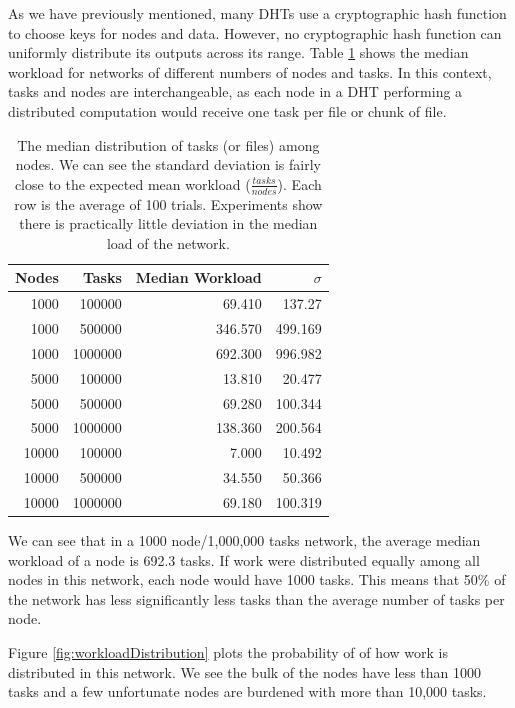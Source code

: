 \documentclass[11pt,conference]{IEEEtran}
\begin{document}
As we have previously mentioned, many DHTs use a cryptographic hash function to choose keys for nodes and data.
However, no cryptographic hash function can uniformly distribute its outputs across its range. 
Table \ref{tab:medianLoads} shows the median workload for networks of different numbers of nodes and tasks.
In this context, tasks and nodes are interchangeable, as each node in a DHT performing a distributed computation would receive one task per file or chunk of file.


\begin{table}
	\centering
	\caption{The median distribution of tasks (or files) among nodes.  We can see the standard deviation is fairly close to the expected mean workload ($\frac{tasks}{nodes}$). Each row is the average of 100 trials.  Experiments show there is practically little deviation in the median load of the network.}
	\begin{tabular}{r r r r}
		Nodes & Tasks & Median Workload & $\sigma$ \\ \hline
		1000 & 100000 & 69.410   &  137.27  \\
		1000 & 500000 & 346.570  &  499.169 \\
		1000 & 1000000 & 692.300  &  996.982 \\
		
		5000 & 100000  & 13.810 & 20.477 \\ 
		5000 & 500000  & 69.280 & 100.344 \\ 
		5000 & 1000000 &138.360 & 200.564 \\ 
		
		10000 & 100000 & 7.000   &  10.492 \\
		10000 & 500000 & 34.550  &   50.366 \\
		10000 & 1000000& 69.180  &  100.319 \\
	\end{tabular}
	\label{tab:medianLoads}
\end{table}



We can see  that in a 1000 node/1,000,000 tasks network, the average median workload of a node is 692.3 tasks. 
If work were distributed equally among all nodes in this network, each node would have 1000 tasks.
This means that 50\% of the network has less significantly less tasks than the average number of tasks per node.

Figure \ref{fig:workloadDistribution} plots the probability of of how work is distributed in this network.
We see the bulk of the nodes have less than 1000 tasks and a few unfortunate nodes are burdened with more than 10,000 tasks.
\end{document}
